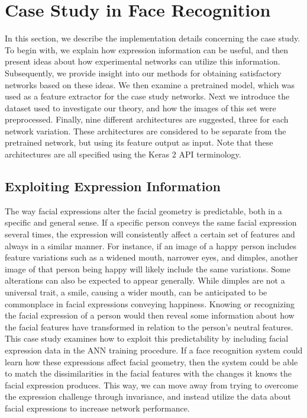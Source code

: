 

\section{Case Study in Face Recognition}

In this section, we describe the implementation details concerning the case study. To begin with, we explain how expression information can be useful, and then present ideas about how experimental networks can utilize this information. Subsequently, we provide insight into our methods for obtaining satisfactory networks based on these ideas. We then examine a pretrained model, which was used as a feature extractor for the case study networks. Next we introduce the dataset used to investigate our theory, and how the images of this set were preprocessed. Finally, nine different architectures are suggested, three for each network variation. These architectures are considered to be separate from the pretrained network, but using its feature output as input. Note that these architectures are all specified using the Keras 2 API terminology.

\subsection{Exploiting Expression Information}

The way facial expressions alter the facial geometry is predictable, both in a specific and general sense. If a specific person conveys the same facial expression several times, the expression will consistently affect a certain set of features and always in a similar manner. For instance, if an image of a happy person includes feature variations such as a widened mouth, narrower eyes, and dimples, another image of that person being happy will likely include the same variations. Some alterations can also be expected to appear generally. While dimples are not a universal trait, a smile, causing a wider mouth, can be anticipated to be commonplace in facial expressions conveying happiness. Knowing or recognizing the facial expression of a person would then reveal some information about how the facial features have transformed in relation to the person's neutral features. This case study examines how to exploit this predictability by including facial expression data in the ANN training procedure. If a face recognition system could learn how these expressions affect facial geometry, then the system could be able to match the dissimilarities in the facial features with the changes it knows the facial expression produces. This way, we can move away from trying to overcome the expression challenge through invariance, and instead utilize the data about facial expressions to increase network performance.

